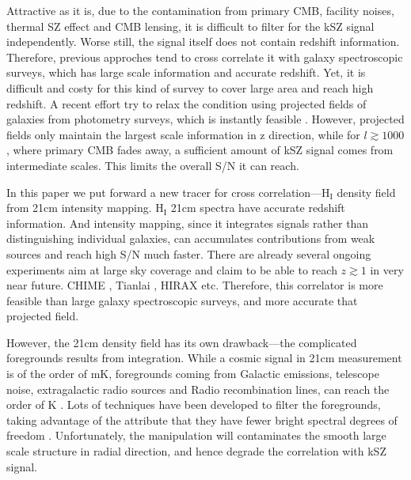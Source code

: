 Attractive as it is, 
due to the contamination from primary CMB, facility noises, 
thermal SZ effect and CMB lensing, 
it is difficult to filter for the kSZ signal independently. 
Worse still, the signal itself does not contain redshift information.
Therefore, previous approches tend to cross correlate it with 
galaxy spectroscopic surveys, 
which has large scale information and accurate redshift. 
Yet, it is difficult and costy for this kind of survey to cover large area 
and reach high redshift.  
A recent effort try to relax the condition using projected fields of galaxies 
from photometry surveys, which is instantly feasible \cite{Hill16}. 
However, projected fields only maintain the largest scale information in z direction, 
while for $l\gtrsim1000$, where primary CMB fades away, a sufficient amount of kSZ signal comes from intermediate scales. 
This limits the overall S/N it can reach.

In this paper we put forward a new tracer for cross correlation---$\mathrm{H_I}$ density field from 21cm intensity mapping. 
$\mathrm{H_I}$ 21cm spectra have accurate redshift information. 
And intensity mapping, since it 
integrates signals 
rather than distinguishing individual galaxies, 
can accumulates contributions from weak sources 
and reach high S/N much faster. 
There are already several ongoing experiments aim at large sky coverage and claim to be able to reach $z\gtrsim1$ in very near future.
CHIME \cite{2014SPIE.9145E..22B}, Tianlai \cite{2015ApJ...798...40X}, 
HIRAX \cite{HIRAX} etc.
Therefore, this correlator is more feasible than large galaxy spectroscopic surveys, 
and more accurate that projected field.

However, the 21cm density field has its own drawback---the complicated foregrounds results from integration. 
While a cosmic signal in 21cm measurement is of the order of mK,  
foregrounds coming from Galactic emissions, telescope noise, 
extragalactic radio sources and Radio recombination lines, 
can reach the order of K \cite{DiMatteo04,Masui13}. 
Lots of techniques have been developed to filter the foregrounds, 
taking advantage of the attribute that they have fewer bright spectral
degrees of freedom \cite{Switzer15}.
Unfortunately, the manipulation will contaminates the smooth large scale structure in radial direction, 
and hence degrade the correlation with kSZ signal.

